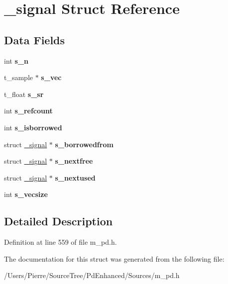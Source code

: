 \hypertarget{struct__signal}{\section{\-\_\-signal Struct Reference}
\label{struct__signal}
}
\subsection*{Data Fields}
\begin{DoxyCompactItemize}
\item 
\hypertarget{struct__signal_aee0a45e5329caef59b617145b09fc3fa}{int {\bfseries s\-\_\-n}}\label{struct__signal_aee0a45e5329caef59b617145b09fc3fa}

\item 
\hypertarget{struct__signal_ad4ecec8b90444188a47a8cde0babc5ae}{t\-\_\-sample $\ast$ {\bfseries s\-\_\-vec}}\label{struct__signal_ad4ecec8b90444188a47a8cde0babc5ae}

\item 
\hypertarget{struct__signal_a8ba1138e0b981e66f0f8bf5d43acc167}{t\-\_\-float {\bfseries s\-\_\-sr}}\label{struct__signal_a8ba1138e0b981e66f0f8bf5d43acc167}

\item 
\hypertarget{struct__signal_a42a0b1e2d910862e122c6f7d405487f5}{int {\bfseries s\-\_\-refcount}}\label{struct__signal_a42a0b1e2d910862e122c6f7d405487f5}

\item 
\hypertarget{struct__signal_a211530a9874e7c762db5ed3331af114d}{int {\bfseries s\-\_\-isborrowed}}\label{struct__signal_a211530a9874e7c762db5ed3331af114d}

\item 
\hypertarget{struct__signal_af3c568b7265404de9c4fc354806b885e}{struct \hyperlink{struct__signal}{\-\_\-signal} $\ast$ {\bfseries s\-\_\-borrowedfrom}}\label{struct__signal_af3c568b7265404de9c4fc354806b885e}

\item 
\hypertarget{struct__signal_a1563a6d75e23f0d92b8842c5523a069e}{struct \hyperlink{struct__signal}{\-\_\-signal} $\ast$ {\bfseries s\-\_\-nextfree}}\label{struct__signal_a1563a6d75e23f0d92b8842c5523a069e}

\item 
\hypertarget{struct__signal_a80b00e740f17b23928cba11f8f0a7c6a}{struct \hyperlink{struct__signal}{\-\_\-signal} $\ast$ {\bfseries s\-\_\-nextused}}\label{struct__signal_a80b00e740f17b23928cba11f8f0a7c6a}

\item 
\hypertarget{struct__signal_a769a509c26775c6ff747d1a1f3326456}{int {\bfseries s\-\_\-vecsize}}\label{struct__signal_a769a509c26775c6ff747d1a1f3326456}

\end{DoxyCompactItemize}


\subsection{Detailed Description}


Definition at line 559 of file m\-\_\-pd.\-h.



The documentation for this struct was generated from the following file\-:\begin{DoxyCompactItemize}
\item 
/\-Users/\-Pierre/\-Source\-Tree/\-Pd\-Enhanced/\-Sources/m\-\_\-pd.\-h\end{DoxyCompactItemize}
